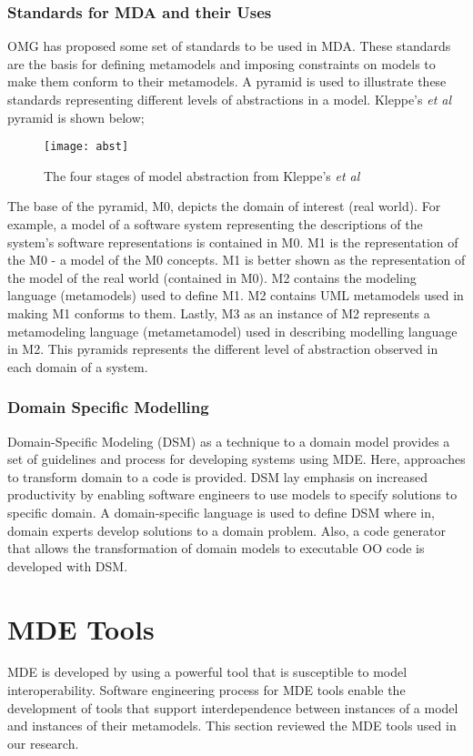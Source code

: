\documentclass[12pt, a4paper]{report}
\begin{document}
\subsubsection{Standards for MDA and their Uses}
OMG has proposed some set of standards to be used in MDA. These standards are the basis for defining metamodels and imposing constraints on models to make them conform to their metamodels. A pyramid is used to illustrate these standards representing different levels of abstractions in a model. Kleppe's \textit{et al} \cite{Kleppe2003} pyramid is shown below;

\begin{figure}[!ht]
  \centering
   \texttt{[image: abst]}
  \caption{The four stages of model abstraction from Kleppe's \textit{et al} \cite{Kleppe2003}}
  \label{fig:mrad}
\end{figure}

The base of the pyramid, M0, depicts the domain of interest (real world). For example, a model of a software system representing the descriptions of the system's software representations is contained in M0. M1 is the representation of the M0 -  a model of the M0 concepts. M1 is better shown as the representation of the model of the real world (contained in M0). M2 contains the modeling language (metamodels) used to define M1. M2 contains UML metamodels used in making M1 conforms to them. Lastly, M3 as an instance of M2 represents a metamodeling language (metametamodel) used in describing modelling language in M2. This pyramids represents the different level of abstraction observed in each domain of a system. 

\subsubsection{Domain Specific Modelling}
Domain-Specific Modeling (DSM) as a technique to a domain model provides a set of guidelines and process for developing systems using MDE. Here, approaches to transform domain to a code is provided. DSM lay emphasis on increased productivity by enabling software engineers to use models to specify solutions to specific domain. A domain-specific language is used to define DSM where in, domain experts develop solutions to a domain problem. Also, a code generator that allows the transformation of domain models to executable OO code is developed with DSM.

\section{MDE Tools} 
 MDE is developed by using a powerful tool that is susceptible to model interoperability.  Software engineering process for MDE tools enable the development of tools that support interdependence between instances of a model and instances of their metamodels. This section reviewed the MDE tools used in our research.
\end{document}
